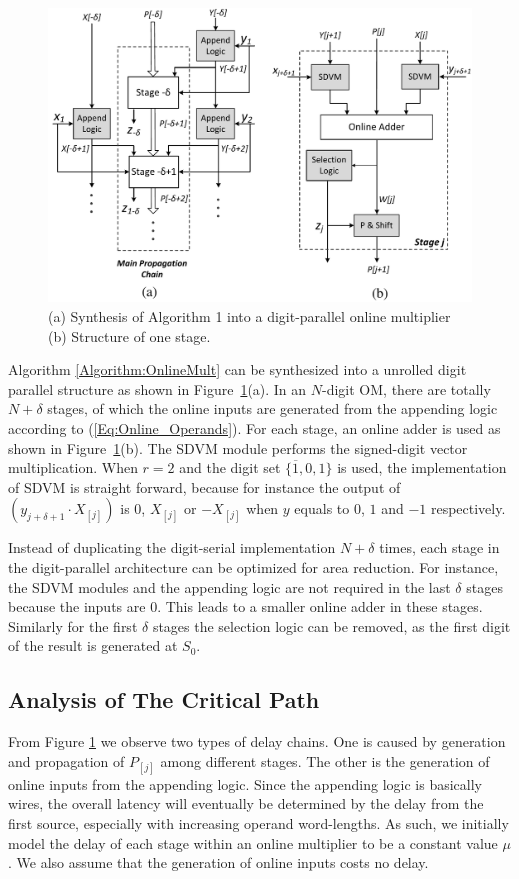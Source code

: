 \documentclass{acm_proc_article-sp}
\begin{document}
%
%
\begin{figure}[tbp]
\centering
\includegraphics[width=.49\textwidth]{./Figures/OnlineMult_Unrolled.pdf}
\vspace{-3ex}
\caption{(a) Synthesis of Algorithm 1 into a digit-parallel online multiplier (b) Structure of one stage.}
\label{Fig:Radix2OnlineMultiplier}
\end{figure}

Algorithm \ref{Algorithm:OnlineMult} can be synthesized into a unrolled digit parallel structure as shown in  Figure~\ref{Fig:Radix2OnlineMultiplier}(a). In an $N$-digit OM, there are totally $N+\delta$ stages, of which the online inputs are generated from the appending logic according to (\ref{Eq:Online_Operands}). For each stage, an online adder is used as shown in Figure~\ref{Fig:Radix2OnlineMultiplier}(b). The SDVM module performs the signed-digit vector multiplication. When $r=2$ and the digit set $\{\overline{1},0,1\}$ is used, the implementation of SDVM is straight forward, because for instance the output of $(y_{j+\delta+1}\cdot X_{[j]})$ is 0, $X_{[j]}$ or $-X_{[j]}$ when $y$ equals to $0$, $1$ and $-1$ respectively.

Instead of duplicating the digit-serial implementation $N+\delta$ times, each stage in the digit-parallel architecture can be optimized for area reduction. For instance, the SDVM modules and the appending logic are not required in the last $\delta$ stages because the inputs are 0. This leads to a smaller online adder in these stages. Similarly for the first $\delta$ stages the selection logic can be removed, as the first digit of the result is generated at $S_0$.

\subsection{Analysis of The Critical Path}

From Figure \ref{Fig:Radix2OnlineMultiplier} we observe two types of delay chains. One is caused by generation and propagation of $P_{[j]}$ among different stages. The other is the generation of online inputs from the appending logic. Since the appending logic is basically wires, the overall latency will eventually be determined by the delay from the first source, especially with increasing operand word-lengths. As such, we initially model the delay of each stage within an online multiplier to be a constant value $\mu$. We also assume that the generation of online inputs costs no delay.
\end{document}

